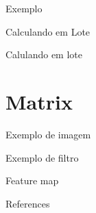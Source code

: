 \documentclass[10pt]{beamer}
\begin{document}
\begin{frame}{Exemplo}

\end{frame}

\begin{frame}{Calculando em Lote}

\end{frame}


\begin{frame}{Calulando em lote}

\end{frame}

\section{Matrix}

\begin{frame}{Exemplo de imagem}

\end{frame}

\begin{frame}{Exemplo de filtro}

\end{frame}

\begin{frame}{Feature map}

\end{frame}

\begin{frame}[allowframebreaks]{References}

  
  

\end{frame}
\end{document}
